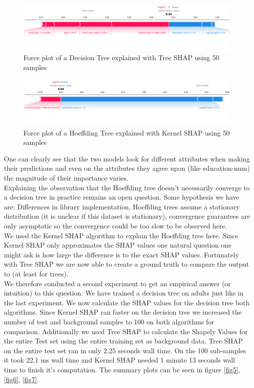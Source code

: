 \documentclass[conference]{IEEEtran}
\begin{document}
\begin{figure}[htbp]
\centerline{
	\includegraphics[width=\textwidth]{../fig/ex_01_TreeShap_DecisionTree_50_Samples_ForcePlot_sample_1.png}
}
\caption{Force plot of a Decision Tree explained with Tree SHAP using 50 samples}
\label{fig3}
\end{figure}

\begin{figure}[htbp]
\centerline{
	\includegraphics[width=\textwidth]{../fig/ex_01_KernelShap_HoeffdingTree_50_Samples_ForcePlot_sample_1.png}
}
\caption{Force plot of a Hoeffding Tree explained with Kernel SHAP using 50 samples}
\label{fig4}
\end{figure}

One can clearly see that the two models look for different attributes when making their predictions and even on the attributes they agree upon (like education-num) the magnitude of their importance varies.\\
Explaining the observation that the Hoeffding tree doesn't necessarily converge to a decision tree in practice remains an open question.
Some hypothesis we have are: Differences in library implementation, Hoeffding trees assume a stationary distribution (it is unclear if this dataset is stationary), convergence guarantees are only asymptotic so the convergence could be too slow to be observed here.\\

We used the Kernel SHAP algorithm to explain the Hoeffding tree here. Since Kernel SHAP only approximates the SHAP values one natural question one might ask is how large the difference is to the exact SHAP values.
Fortunately with Tree SHAP we are now able to create a ground truth to compare the output to (at least for trees).\\
We therefore conducted a second experiment to get an empirical answer (or intuition) to this question.
We have trained a decision tree on adults just like in the last experiment. 
We now calculate the SHAP values for the decision tree both algorithms. 
Since Kernel SHAP ran faster on the decision tree we increased the number of test and background samples to 100 on both algorithms for comparison.
Additionally we used Tree SHAP to calculate the Shapely Values for the entire Test set using the entire training set as background data.
Tree SHAP on the entire test set ran in only 2.25 seconds wall time. On the 100 sub-samples it took 22.1 ms wall time and Kernel SHAP needed 1 minute 13 seconds wall time to finish it's computation.
The summary plots can be seen in figure \ref{fig5}, \ref{fig6}, \ref{fig7}.
\end{document}

